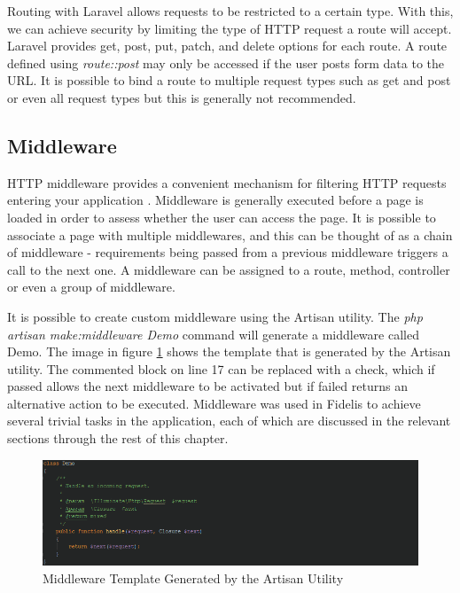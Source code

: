 Routing with Laravel allows requests to be restricted to a certain type. With this, we can achieve security by limiting the type of HTTP request a route will accept. Laravel provides get, post, put, patch, and delete options for each route. A route defined using \emph{route::post} may only be accessed if the user posts form data to the URL. It is possible to bind a route to multiple request types such as get and post or even all request types but this is generally not recommended.

\subsection{Middleware}
HTTP middleware provides a convenient mechanism for filtering HTTP requests entering your application \cite{Laravel:Middleware}. Middleware is generally executed before a page is loaded in order to assess whether the user can access the page. It is possible to associate a page with multiple middlewares, and this can be thought of as a chain of middleware - requirements being passed from a previous middleware triggers a call to the next one. A middleware can be assigned to a route, method, controller or even a group of middleware.

It is possible to create custom middleware using the Artisan utility. The \textit{php artisan make:middleware Demo} command will generate a middleware called Demo. The image in figure \ref{fig:MiddlewareTemplate} shows the template that is generated by the Artisan utility. The commented block on line 17 can be replaced with a check, which if passed allows the next middleware to be activated but if failed returns an alternative action to be executed. Middleware was used in Fidelis to achieve several trivial tasks in the application, each of which are discussed in the relevant sections through the rest of this chapter.

\begin{figure}[H]
	\centering
	\includegraphics[width=\textwidth]{Images/Implementation/MiddlewareTemplate}
	\caption{Middleware Template Generated by the Artisan Utility} \label{fig:MiddlewareTemplate}
\end{figure}